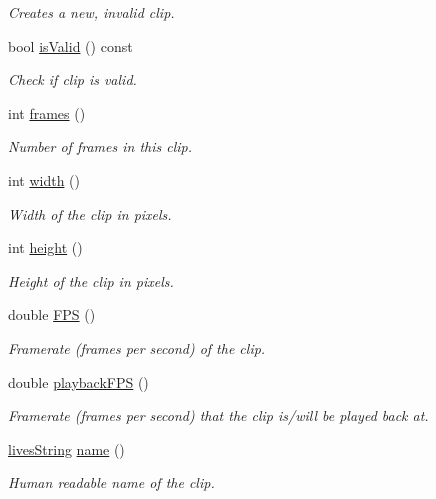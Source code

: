 \begin{DoxyCompactItemize}
\begin{DoxyCompactList}\small\item\em Creates a new, invalid clip. \end{DoxyCompactList}\item 
bool \hyperlink{classlives_1_1clip_a88bf045cdf742f71a69e304600f6e754}{is\-Valid} () const 
\begin{DoxyCompactList}\small\item\em Check if clip is valid. \end{DoxyCompactList}\item 
int \hyperlink{classlives_1_1clip_ad39f6a40689883e78027abb732012ccc}{frames} ()
\begin{DoxyCompactList}\small\item\em Number of frames in this clip. \end{DoxyCompactList}\item 
int \hyperlink{classlives_1_1clip_ae3f457877690885c22a53dc5f907a5ae}{width} ()
\begin{DoxyCompactList}\small\item\em Width of the clip in pixels. \end{DoxyCompactList}\item 
int \hyperlink{classlives_1_1clip_aeb64c681f3cc583d140ddeca48c08d63}{height} ()
\begin{DoxyCompactList}\small\item\em Height of the clip in pixels. \end{DoxyCompactList}\item 
double \hyperlink{classlives_1_1clip_aa05a99708f06d6718fee8621a621f894}{F\-P\-S} ()
\begin{DoxyCompactList}\small\item\em Framerate (frames per second) of the clip. \end{DoxyCompactList}\item 
double \hyperlink{classlives_1_1clip_ac1ac02deaaa685277b02b20363a6335a}{playback\-F\-P\-S} ()
\begin{DoxyCompactList}\small\item\em Framerate (frames per second) that the clip is/will be played back at. \end{DoxyCompactList}\item 
\hyperlink{classlives_1_1livesString}{lives\-String} \hyperlink{classlives_1_1clip_a29e213434a96677925531f576b23ff0b}{name} ()
\begin{DoxyCompactList}\small\item\em Human readable name of the clip. \end{DoxyCompactList}\item 

\end{DoxyCompactItemize}
